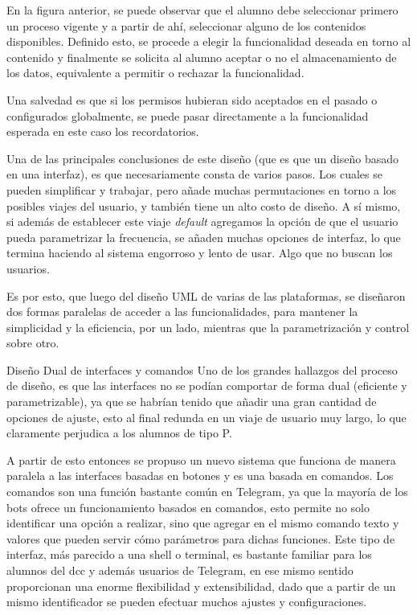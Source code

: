     \par En la figura anterior, se puede observar que el alumno debe seleccionar primero un proceso vigente y a partir de ahí, seleccionar alguno de los contenidos disponibles. Definido esto, se procede a elegir la funcionalidad deseada en torno al contenido y finalmente se solicita al alumno aceptar o no el almacenamiento de los datos, equivalente a permitir o rechazar la funcionalidad. 
    \par Una salvedad es que si los permisos hubieran sido aceptados en el pasado o configurados globalmente, se puede pasar directamente a la funcionalidad esperada en este caso los recordatorios.
    \par Una de las principales conclusiones de este diseño (que es que un diseño basado en una interfaz), es que necesariamente consta de varios pasos. Los cuales se pueden simplificar y trabajar, pero añade muchas permutaciones en torno a los posibles viajes del usuario, y también tiene un alto costo de diseño. A sí mismo, si además de establecer este viaje \textit{default} agregamos la opción de que el usuario pueda parametrizar la frecuencia, se añaden muchas opciones de interfaz, lo que termina haciendo al sistema engorroso y lento de usar. Algo que no buscan los usuarios.
    \par Es por esto, que luego del diseño UML de varias de las plataformas, se diseñaron dos formas paralelas de acceder a las funcionalidades, para mantener la simplicidad y la eficiencia, por un lado, mientras que la parametrización y control sobre otro.
    \par Diseño Dual de interfaces y comandos
    Uno de los grandes hallazgos del proceso de diseño, es que las interfaces no se podían comportar de forma dual (eficiente y parametrizable), ya que se habrían tenido que añadir una gran cantidad de opciones de ajuste, esto al final redunda en un viaje de usuario muy largo, lo que claramente perjudica a los alumnos de tipo P.
    \par A partir de esto entonces se propuso un nuevo sistema que funciona de manera paralela a las interfaces basadas en botones y es una basada en comandos.
    Los comandos son una función bastante común en Telegram, ya que la mayoría de los bots ofrece un funcionamiento basados en comandos, esto permite no solo identificar una opción a realizar, sino que agregar en el mismo comando texto y valores que pueden servir cómo parámetros para dichas funciones. Este tipo de interfaz, más parecido a una shell o terminal, es bastante familiar para los alumnos del dcc y además usuarios de Telegram, en ese mismo sentido proporcionan una enorme flexibilidad y extensibilidad, dado que a partir de un mismo identificador se pueden efectuar muchos ajustes y configuraciones.


